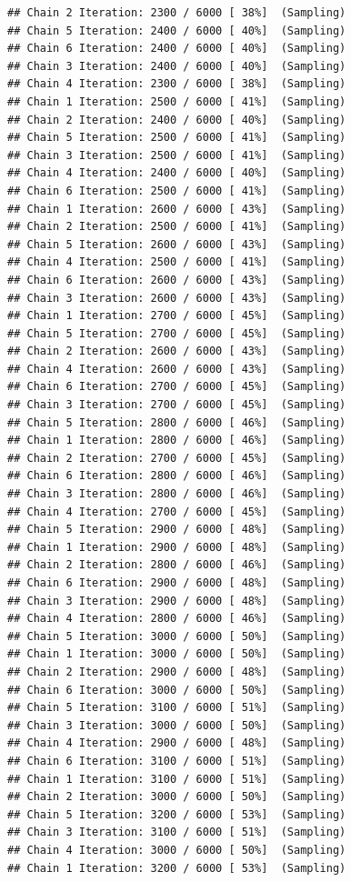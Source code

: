 \documentclass[
]{article}
\begin{document}
\begin{verbatim}
## Chain 2 Iteration: 2300 / 6000 [ 38%]  (Sampling) 
## Chain 5 Iteration: 2400 / 6000 [ 40%]  (Sampling) 
## Chain 6 Iteration: 2400 / 6000 [ 40%]  (Sampling) 
## Chain 3 Iteration: 2400 / 6000 [ 40%]  (Sampling) 
## Chain 4 Iteration: 2300 / 6000 [ 38%]  (Sampling) 
## Chain 1 Iteration: 2500 / 6000 [ 41%]  (Sampling) 
## Chain 2 Iteration: 2400 / 6000 [ 40%]  (Sampling) 
## Chain 5 Iteration: 2500 / 6000 [ 41%]  (Sampling) 
## Chain 3 Iteration: 2500 / 6000 [ 41%]  (Sampling) 
## Chain 4 Iteration: 2400 / 6000 [ 40%]  (Sampling) 
## Chain 6 Iteration: 2500 / 6000 [ 41%]  (Sampling) 
## Chain 1 Iteration: 2600 / 6000 [ 43%]  (Sampling) 
## Chain 2 Iteration: 2500 / 6000 [ 41%]  (Sampling) 
## Chain 5 Iteration: 2600 / 6000 [ 43%]  (Sampling) 
## Chain 4 Iteration: 2500 / 6000 [ 41%]  (Sampling) 
## Chain 6 Iteration: 2600 / 6000 [ 43%]  (Sampling) 
## Chain 3 Iteration: 2600 / 6000 [ 43%]  (Sampling) 
## Chain 1 Iteration: 2700 / 6000 [ 45%]  (Sampling) 
## Chain 5 Iteration: 2700 / 6000 [ 45%]  (Sampling) 
## Chain 2 Iteration: 2600 / 6000 [ 43%]  (Sampling) 
## Chain 4 Iteration: 2600 / 6000 [ 43%]  (Sampling) 
## Chain 6 Iteration: 2700 / 6000 [ 45%]  (Sampling) 
## Chain 3 Iteration: 2700 / 6000 [ 45%]  (Sampling) 
## Chain 5 Iteration: 2800 / 6000 [ 46%]  (Sampling) 
## Chain 1 Iteration: 2800 / 6000 [ 46%]  (Sampling) 
## Chain 2 Iteration: 2700 / 6000 [ 45%]  (Sampling) 
## Chain 6 Iteration: 2800 / 6000 [ 46%]  (Sampling) 
## Chain 3 Iteration: 2800 / 6000 [ 46%]  (Sampling) 
## Chain 4 Iteration: 2700 / 6000 [ 45%]  (Sampling) 
## Chain 5 Iteration: 2900 / 6000 [ 48%]  (Sampling) 
## Chain 1 Iteration: 2900 / 6000 [ 48%]  (Sampling) 
## Chain 2 Iteration: 2800 / 6000 [ 46%]  (Sampling) 
## Chain 6 Iteration: 2900 / 6000 [ 48%]  (Sampling) 
## Chain 3 Iteration: 2900 / 6000 [ 48%]  (Sampling) 
## Chain 4 Iteration: 2800 / 6000 [ 46%]  (Sampling) 
## Chain 5 Iteration: 3000 / 6000 [ 50%]  (Sampling) 
## Chain 1 Iteration: 3000 / 6000 [ 50%]  (Sampling) 
## Chain 2 Iteration: 2900 / 6000 [ 48%]  (Sampling) 
## Chain 6 Iteration: 3000 / 6000 [ 50%]  (Sampling) 
## Chain 5 Iteration: 3100 / 6000 [ 51%]  (Sampling) 
## Chain 3 Iteration: 3000 / 6000 [ 50%]  (Sampling) 
## Chain 4 Iteration: 2900 / 6000 [ 48%]  (Sampling) 
## Chain 6 Iteration: 3100 / 6000 [ 51%]  (Sampling) 
## Chain 1 Iteration: 3100 / 6000 [ 51%]  (Sampling) 
## Chain 2 Iteration: 3000 / 6000 [ 50%]  (Sampling) 
## Chain 5 Iteration: 3200 / 6000 [ 53%]  (Sampling) 
## Chain 3 Iteration: 3100 / 6000 [ 51%]  (Sampling) 
## Chain 4 Iteration: 3000 / 6000 [ 50%]  (Sampling) 
## Chain 1 Iteration: 3200 / 6000 [ 53%]  (Sampling) 

\end{verbatim}
\end{document}
